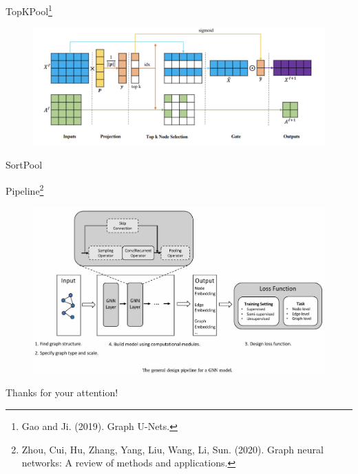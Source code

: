 \documentclass{beamer}
\begin{document}
\begin{frame}{TopKPool\footnote{Gao and Ji. (2019).
Graph U-Nets.}}
\begin{figure}
\includegraphics[width=0.95\linewidth]{Images/TopKpool.png}
\end{figure}
\end{frame}
\begin{frame}{SortPool}
\end{frame}
\begin{frame}{Pipeline\footnote{Zhou, Cui, Hu, Zhang, Yang, Liu, Wang, Li, Sun. (2020).
Graph neural networks: A review of methods and applications.}}
\begin{figure}
\includegraphics[width=0.95\linewidth]{Images/GNN_pipeline.jpg}
\end{figure}
\end{frame}
\begin{frame}
\begin{center}
\Huge Thanks for your attention!
\end{center}
\end{frame}
\end{document}
